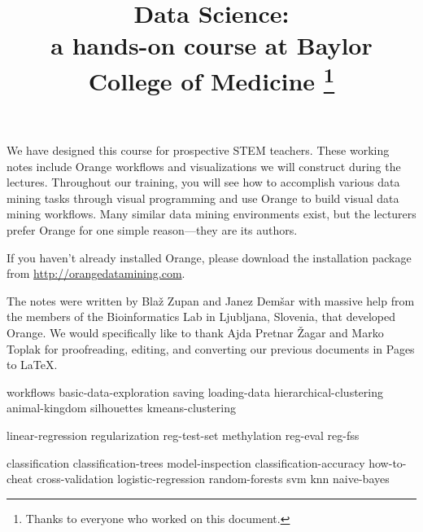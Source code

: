 \documentclass[symmetric, justified, a4paper, nofonts]{tufte-book}
\title{Data Science: \\ {\large a hands-on course at Baylor College of Medicine}
\thanks{Thanks to everyone who worked on this document.}}
\author{}
\begin{document}
\frontmatter

\maketitle

We have designed this course for prospective STEM teachers. These working notes include Orange workflows and visualizations we will construct during the lectures. Throughout our training, you will see how to accomplish various data mining tasks through visual programming and use Orange to build visual data mining workflows. Many similar data mining environments exist, but the lecturers prefer Orange for one simple reason—they are its authors.

If you haven't already installed Orange, please download the installation package from \url{http://orangedatamining.com}.

The notes were written by Blaž Zupan and Janez Demšar with massive help from the members of the Bioinformatics Lab in Ljubljana, Slovenia, that developed Orange. We would specifically like to thank Ajda Pretnar Žagar and Marko Toplak for proofreading, editing, and converting our previous documents in Pages to LaTeX.



\tableofcontents

\mainmatter

{workflows}
{basic-data-exploration}
{saving}
{loading-data}
{hierarchical-clustering}
{animal-kingdom}
{silhouettes}
{kmeans-clustering}

{linear-regression}
{regularization}
{reg-test-set}
{methylation}
{reg-eval}
{reg-fss}


{classification}
{classification-trees}
{model-inspection}
{classification-accuracy}
{how-to-cheat}
{cross-validation}
{logistic-regression}
{random-forests}
{svm}
{knn}
{naive-bayes}
\end{document}
